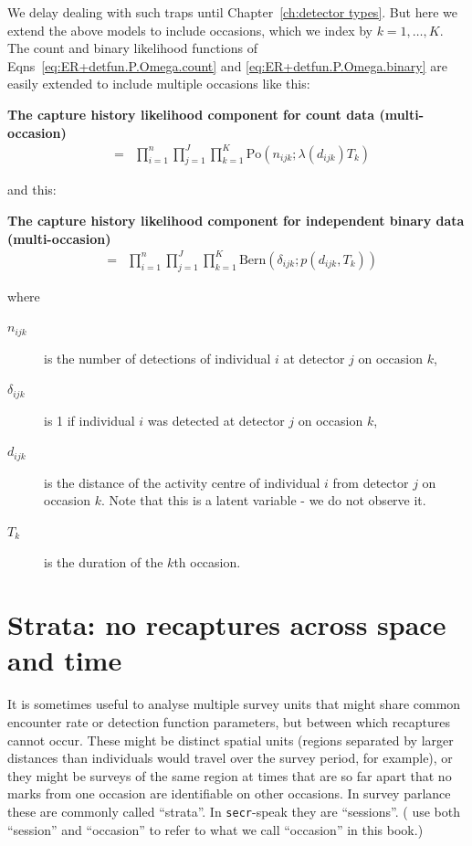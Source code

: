 \documentclass[graybox,envcountchap,sectrefs]{SpringerStyleFiles/styles/svmono}\usepackage[]{graphicx}\usepackage[]{color}
\newcommand{\be}{\begin{eqnarray}}
\newcommand{\ee}{\end{eqnarray}}
\newcommand{\bd}{\begin{description}}
\newcommand{\ed}{\end{description}}
\begin{document}
We delay dealing with such traps until Chapter~\ref{ch:detector types}. But here we extend the above models to include occasions, which we index by $k=1,\ldots,K$. The count and binary likelihood functions of Eqns~\eqref{eq:ER+detfun.P.Omega.count} and \eqref{eq:ER+detfun.P.Omega.binary} are easily extended to include multiple occasions like this:
\begin{svgraybox}
\bf{The capture history likelihood component for count data (multi-occasion)}
\be
[\bm{\Omega}_n|\bm{S}_n]&=&\prod_{i=1}^n\prod_{j=1}^J\prod_{k=1}^K\mbox{Po}\left(n_{ijk};\lambda(d_{ijk})T_k\right)
\label{eq:ER+detfun.P.Omega.count.occ}
\ee
\end{svgraybox}
and this:
\begin{svgraybox}
\bf{The capture history likelihood component for independent binary data (multi-occasion)}
\be
[\bm{\Omega}_n|\bm{S}_n]&=&\prod_{i=1}^n\prod_{j=1}^J\prod_{k=1}^K\mbox{Bern}\left(\delta_{ijk};p(d_{ijk},T_k)\right)
\label{eq:ER+detfun.P.Omega.binary.occ}
\ee
\end{svgraybox}
\noindent
where
\begin{svgraybox}
\bd
\item[$n_{ijk}$] is the number of detections of individual $i$ at detector $j$ on occasion $k$,
\item[$\delta_{ijk}$] is 1 if individual $i$ was detected at detector $j$ on occasion $k$,
\item[$d_{ijk}$] is the distance of the activity centre of individual $i$ from detector $j$ on occasion $k$. Note that this is a latent variable - we do not observe it.
\item[$T_k$] is the duration of the $k$th occasion.
\ed
\end{svgraybox}

\section{Strata: no recaptures across space and time}
\label{sec:ER+detfun.strata}

It is sometimes useful to analyse multiple survey units that might share common encounter rate or detection function parameters, but between which recaptures cannot occur. These might be distinct spatial units (regions separated by larger distances than individuals would travel over the survey period, for example), or they might be surveys of the same region at times that are so far apart that no marks from one occasion are identifiable on other occasions. In survey parlance these are commonly called ``strata''. In \texttt{secr}-speak they are ``sessions''. (\cite{Royle+al:14} use both ``session'' and ``occasion'' to refer to what we call ``occasion'' in this book.)
\end{document}
